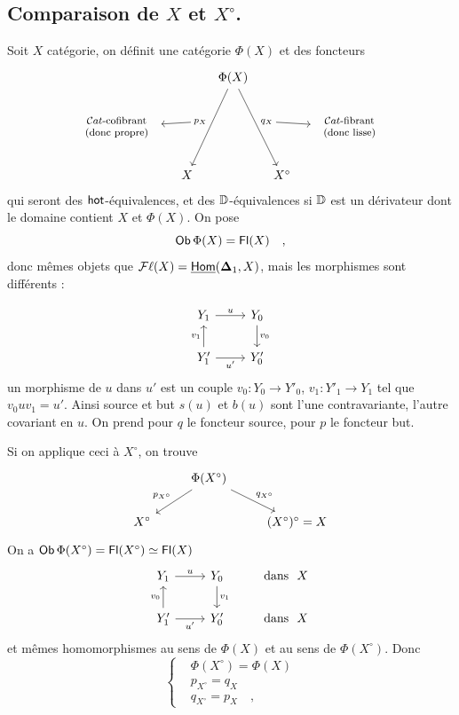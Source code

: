 
\subsection*{Comparaison de $X$ et $X^{\circ}$.}

Soit $X$ catégorie, on définit une catégorie $\Phi(X)$ et des foncteurs
\[
\begin{tikzcd}[column sep=small]
& & \Phi(X) \arrow[ddl, "p_X"{swap, name=P}] \arrow[ddr, "q_X"{name=Q}] & & \\
|[alias=L]| \text{\footnotesize\begin{tabular}{c}$\Cat$-cofibrant\\(donc propre)\end{tabular}} & & & & |[alias=R]| \text{\footnotesize\begin{tabular}{c}$\Cat$-fibrant\\(donc lisse)\\ \end{tabular}} \\
& X & & X^{\circ} &
\arrow[from=P, to=L]
\arrow[from=Q, to=R]
\end{tikzcd}
\]
qui seront des $\mathsf{hot}$-équivalences, et des $\mathbb{D}$-équivalences si $\mathbb{D}$ est un dérivateur dont le domaine contient $X$ et $\Phi(X)$. On pose
\[
\mathsf{Ob}\, \Phi(X) = \mathsf{Fl}(X) \quad ,
\]
donc mêmes objets que $\mathcal{F}\ell(X) = \underline{\mathsf{Hom}}(\boldsymbol{\Delta}_1, X)$, mais les morphismes sont différents :

\[
\begin{tikzcd}
Y_1 \arrow[r, "u"] & Y_0 \arrow[d, "v_0"] \\
Y'_1 \arrow[u, "v_1"] \arrow[r, "u'"{swap}] & Y'_0
\end{tikzcd}
\]
un morphisme de $u$ dans $u'$ est un couple $v_0 : Y_0 \to Y'_0$, $v_1 : Y'_1 \to Y_1$ tel que $v_0uv_1 = u'$. Ainsi source et but $s(u)$ et $b(u)$ sont l'une contravariante, l'autre covariant en $u$. On prend pour $q$ le foncteur source, pour $p$ le foncteur but. %

Si on applique ceci à $X^{\circ}$, on trouve
\[
\begin{tikzcd}
& \Phi(X^{\circ}) \arrow[dl, "p_{X^{\circ}}"{swap}] \arrow[dr, "q_{X^{\circ}}"] & \\
X^{\circ} & & (X^{\circ})^{\circ} = X
\end{tikzcd}
\]
On a $\mathsf{Ob}\, \Phi(X^{\circ}) = \mathsf{Fl}(X^{\circ}) \simeq \mathsf{Fl}(X)$
\[
\begin{tikzcd}
Y_1 \arrow[r, "u"] & Y_0 \arrow[d, "v_1"] & \text{dans}\ \ X \\
Y'_1 \arrow[u, "v_0"] \arrow[r, "u'"{swap}] & Y'_0 & \text{dans}\ \ X
\end{tikzcd}
\]
et mêmes homomorphismes au sens de $\Phi(X)$ et au sens de $\Phi(X^{\circ})$. Donc
\[
\left\{
\begin{aligned}
&\Phi(X^{\circ}) = \Phi(X) \\
&p_{X^{\circ}} = q_X \\
&q_{X^{\circ}} = p_X \quad ,
\end{aligned}
\right.
\]

